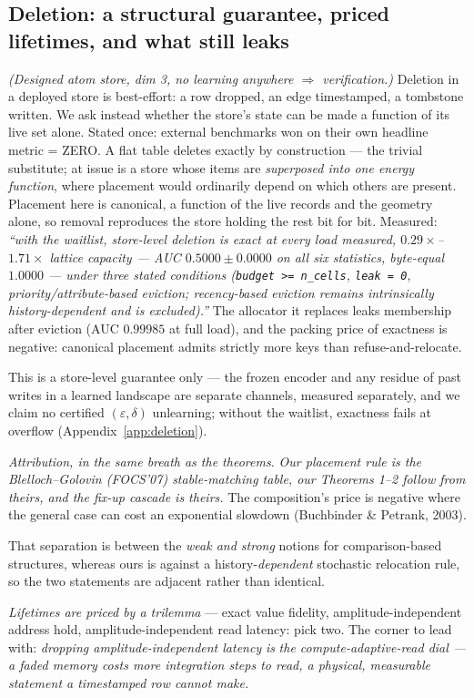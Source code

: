 \subsection{Deletion: a structural guarantee, priced lifetimes, and what still leaks}\label{sec:deletion}

\emph{(Designed atom store, dim 3, no learning anywhere $\Rightarrow$ verification.)} Deletion in a deployed store is best-effort: a row dropped, an edge timestamped, a tombstone written. We ask instead whether the store's state can be made a function of its live set alone. Stated once: external benchmarks won on their own headline metric = ZERO. A flat table deletes exactly by construction --- the trivial substitute; at issue is a store whose items are \emph{superposed into one energy function}, where placement would ordinarily depend on which others are present. Placement here is canonical, a function of the live records and the geometry alone, so removal reproduces the store holding the rest bit for bit. Measured: \emph{``with the waitlist, store-level deletion is exact at every load measured, $0.29\times$--$1.71\times$ lattice capacity --- AUC $0.5000\pm0.0000$ on all six statistics, byte-equal $1.0000$ --- under three stated conditions (\texttt{budget >= n\_cells}, \texttt{leak = 0}, priority/attribute-based eviction; recency-based eviction remains intrinsically history-dependent and is excluded).''} The allocator it replaces leaks membership after eviction (AUC $0.99985$ at full load), and the packing price of exactness is negative: canonical placement admits strictly more keys than refuse-and-relocate. {\scriptsize This is a store-level guarantee only --- the frozen encoder and any residue of past writes in a learned landscape are separate channels, measured separately, and we claim no certified $(\varepsilon,\delta)$ unlearning; without the waitlist, exactness fails at overflow (Appendix~\ref{app:deletion}).\par} \emph{Attribution, in the same breath as the theorems.} \emph{Our placement rule is the Blelloch--Golovin (FOCS'07) stable-matching table, our Theorems 1--2 follow from theirs, and the fix-up cascade is theirs.} The composition's price is negative where the general case can cost an exponential slowdown (Buchbinder \& Petrank, 2003). {\scriptsize That separation is between the \emph{weak and strong} notions for comparison-based structures, whereas ours is against a history-\emph{dependent} stochastic relocation rule, so the two statements are adjacent rather than identical.\par} \emph{Lifetimes are priced by a trilemma} --- exact value fidelity, amplitude-independent address hold, amplitude-independent read latency: pick two. The corner to lead with: \emph{dropping amplitude-independent latency} \emph{is} \emph{the compute-adaptive-read dial --- a faded memory costs more integration steps to read, a physical, measurable statement a timestamped row cannot make.}

